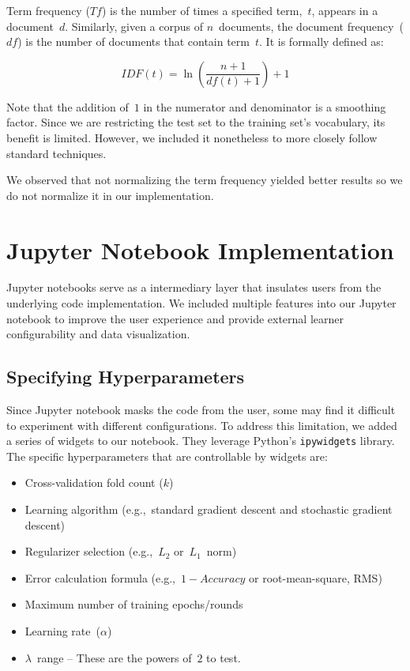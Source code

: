 \documentclass{report}
\begin{document}
  Term frequency ($Tf$) is the number of times a specified term,~$t$, appears in a document~$d$.  Similarly, given a corpus of $n$~documents, the document frequency~($df$) is the number of documents that contain term~$t$.  It is formally defined as:
  
  \begin{equation}
    IDF(t)= \ln \left( \frac{n+1}{df(t) + 1} \right)  + 1
  \end{equation}
  
  Note that the addition of~$1$ in the numerator and denominator is a smoothing factor.  Since we are restricting the test set to the training set's vocabulary, its benefit is limited.  However, we included it nonetheless to more closely follow standard techniques.
  
  We observed that not normalizing the term frequency yielded better results so we do not normalize it in our implementation.

  \section{Jupyter Notebook Implementation}
  
  Jupyter notebooks serve as a intermediary layer that insulates users from the underlying code implementation.  We included multiple features into our Jupyter notebook to improve the user experience and provide external learner configurability and data visualization.
  
  \subsection{Specifying Hyperparameters}
  
  Since Jupyter notebook masks the code from the user, some may find it difficult to experiment with different configurations.  To address this limitation, we added a series of widgets to our notebook.  They leverage Python's \texttt{ipywidgets} library.  The specific hyperparameters that are controllable by widgets are:
  
  \begin{itemize}
    \setlength\itemsep{0pt}
    \item Cross-validation fold count ($k$)
    \item Learning algorithm (e.g.,~standard gradient descent and stochastic gradient descent)
    \item Regularizer selection (e.g.,~$L_2$ or~$L_1$~norm)
    \item Error calculation formula (e.g.,~$1 - Accuracy$ or root-mean-square, RMS)
    \item Maximum number of training epochs/rounds
    \item Learning rate~($\alpha$)
    \item $\lambda$~range -- These are the powers of~$2$ to test.
  \end{itemize}
  
\end{document}
